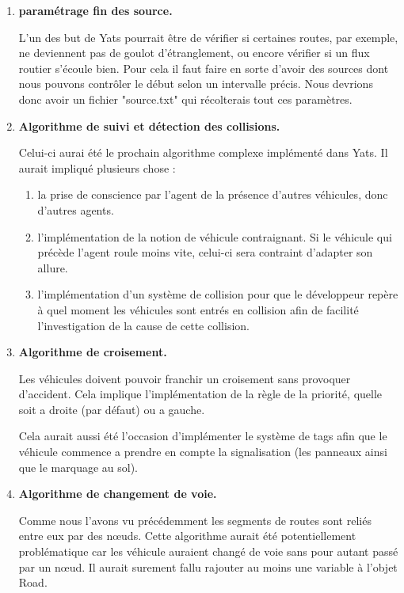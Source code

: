 \documentclass[a4paper,11pt]{article}
\begin{document}
\begin{enumerate}[label=-]


\item \textbf{paramétrage fin des source.}


L'un des but de Yats pourrait être de vérifier si certaines routes, par exemple, ne deviennent pas de goulot d'étranglement, ou encore vérifier si un flux routier s'écoule bien. Pour cela il faut faire en sorte d'avoir des sources dont nous pouvons contrôler le début selon un intervalle précis. Nous devrions donc avoir un fichier "source.txt" qui récolterais tout ces paramètres.


\item \textbf{Algorithme de suivi et détection des collisions.}


Celui-ci aurai été le prochain algorithme complexe implémenté dans Yats. Il aurait impliqué plusieurs chose : 


\begin{enumerate}[label=*]

\item la prise de conscience par l'agent de la présence d'autres véhicules, donc d'autres agents.


\item l'implémentation de la notion de véhicule contraignant. Si le véhicule qui précède l'agent roule moins vite, celui-ci sera contraint d'adapter son allure.


\item l'implémentation d'un système de collision pour que le développeur repère à quel moment les véhicules sont entrés en collision afin de facilité l'investigation de la cause de cette collision.

\end{enumerate}

\item \textbf{Algorithme de croisement.}

Les véhicules doivent pouvoir franchir un croisement sans provoquer d'accident. Cela implique l'implémentation de la règle de la priorité, quelle soit a droite (par défaut) ou a gauche. 

Cela aurait aussi été l'occasion d'implémenter le système de tags afin que le véhicule commence a prendre en compte la signalisation (les panneaux ainsi que le marquage au sol).

\item \textbf{Algorithme de changement de voie.}

Comme nous l'avons vu précédemment les segments de routes sont reliés entre eux par des nœuds. Cette algorithme aurait été potentiellement problématique car les véhicule auraient changé de voie sans pour autant passé par un nœud. Il aurait surement fallu rajouter au moins une variable à l'objet Road.


\end{enumerate}
\end{document}
